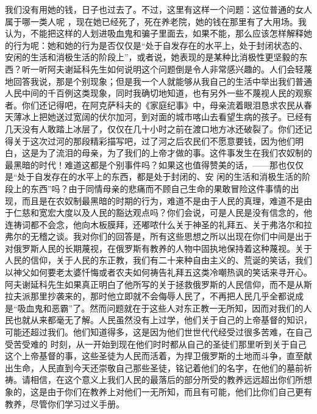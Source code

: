 \documentclass{article}
\begin{document}
我们没有用她的钱，日子也过去了。不过，这里有这样一个问题：这位普通的女人属于哪一类人呢
\newpage
，现在她已经死了，死在养老院，她的钱在那里有了大用场。我认为，不能把这样的人划进吸血鬼和骗子里面去，如果不能，那么应该怎样解释她的行为呢：她和她的行为是否仅仅是“处于自发存在的水平上，处于封闭状态的、安闲的生活和消极生活的阶段上”，或者说，她表现的是某种比消极性更坚毅的东西？听一听阿夫谢延科先生如何说明这个问题倒是令人非常感兴趣的。人们会轻蔑地回答我说，那是个别现象；但是我一个人就能够从我自己的生活中举出我们普通人民中间的千百例这类现象，同时我确切地知道，也有另外一些不蔑视人民的观察者。你们还记得吧，在阿克萨科夫的《家庭纪事》中，母亲流着眼泪恳求农民从春天薄冰上把她送过宽阔的伏尔加河，到对面的城市喀山去看望生病的孩子。已经有几天没有人敢踏上冰层了，仅仅在几十小时之前在渡口地方冰还破裂了。你们还记得关于这次过河的那段精彩描写吧，过了河之后农民们不愿意要钱，因为他们明白，这是为了流泪的母亲，为了我们的上帝才做的事。这件事发生在我们农奴制的最黑暗的时代！难道这都是个别事件吗？如果这也值得赞美的话，——那也仅仅是“处于自发存在的水平上的东西，都是处于封闭的、安
\newpage
闲的生活和消极生活的阶段上的东西”吗？由于同情母亲的悲痛而不顾自己生命的果敢冒险这件事情的出现，而且是在农奴制最黑暗的时期的行为，难道不是由于人民的真理，难道不是由于仁慈和宽宏大度以及人民的豁达观点吗？你们会说，可是人民是没有信念的，他连祷词都不会念，他向木板膜拜，还嘟哝什么关于神圣的礼拜五、关于弗洛尔和拉弗尔的无稽之谈。我对你们的回答是，所有这些思想之所以出现在你们中间是出于对俄罗斯人民的长期蔑视，在俄罗斯有教养的人物中固执地保持着这种蔑视。关于人民的信仰，关于人民的东正教，我们有二十来种自由主义的、荒诞的笑话，我们以神父如何要老太婆忏悔或者农夫如何祷告礼拜五这类冷嘲热讽的笑话来寻开心。阿夫谢延科先生如果真正明白了他所写的关于拯救俄罗斯的人民信仰，而不是从斯拉夫派那里抄袭来的，那时他立即就不会侮辱人民了，不再把人民几乎全都说成是“吸血鬼和恶霸”了。然而问题就在于这些人对东正教一无所知，因而对我们的人民也就从来都毫无了解。人民虽然没有上过学，他们关于自己的上帝基督的知识，可能还超过我们。他们知道得多，这是因为他们世世代代经受过很多苦难，在自己受苦受难的
\newpage
时刻，从一开始到现在他们时时都从自己的圣徒们那里听到关于自己这个上帝基督的事，这些圣徒为人民而活着，为捍卫俄罗斯的土地而斗争，直至献出生命，人民直到今天还崇敬自己那些圣徒，铭记着他们的名字，在他们的墓前祈祷。请相信，在这个意义上我们人民的最落后的部分所受的教养远远超出你们所想象的，这是由于你们在教养上对他们一无所知，而且有可能，他们比你们自己更有教养，尽管你们学习过义手册。
\end{document}
